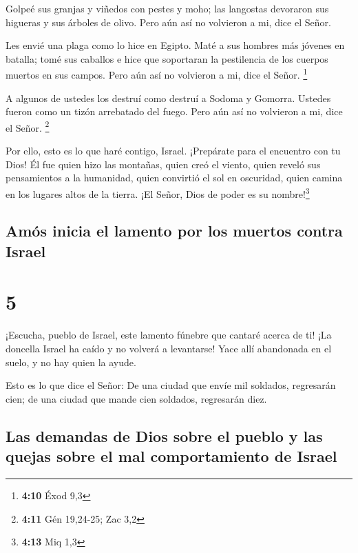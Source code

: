  Golpeé sus granjas y viñedos con pestes y moho; las
langostas devoraron sus higueras y sus árboles de olivo. Pero aún así no
volvieron a mi, dice el Señor.

 Les envié una plaga como lo hice en Egipto. Maté a sus
hombres más jóvenes en batalla; tomé sus caballos e hice que soportaran
la pestilencia de los cuerpos muertos en sus campos. Pero aún así no
volvieron a mi, dice el Señor. \footnote{\textbf{4:10} Éxod 9,3}

 A algunos de ustedes los destruí como destruí a Sodoma y
Gomorra. Ustedes fueron como un tizón arrebatado del fuego. Pero aún así
no volvieron a mi, dice el Señor. \footnote{\textbf{4:11} Gén 19,24-25;
  Zac 3,2}

 Por ello, esto es lo que haré contigo, Israel.
¡Prepárate para el encuentro con tu Dios!  Él fue quien
hizo las montañas, quien creó el viento, quien reveló sus pensamientos a
la humanidad, quien convirtió el sol en oscuridad, quien camina en los
lugares altos de la tierra. ¡El Señor, Dios de poder es su
nombre!\footnote{\textbf{4:13} Miq 1,3}

\hypertarget{amuxf3s-inicia-el-lamento-por-los-muertos-contra-israel}{%
\subsection{Amós inicia el lamento por los muertos contra
Israel}\label{amuxf3s-inicia-el-lamento-por-los-muertos-contra-israel}}

\hypertarget{section-4}{%
\section{5}\label{section-4}}

 ¡Escucha, pueblo de Israel, este lamento fúnebre que
cantaré acerca de ti!  ¡La doncella Israel ha caído y no
volverá a levantarse! Yace allí abandonada en el suelo, y no hay quien
la ayude.

 Esto es lo que dice el Señor: De una ciudad que envíe mil
soldados, regresarán cien; de una ciudad que mande cien soldados,
regresarán diez.

\hypertarget{las-demandas-de-dios-sobre-el-pueblo-y-las-quejas-sobre-el-mal-comportamiento-de-israel}{%
\subsection{Las demandas de Dios sobre el pueblo y las quejas sobre el
mal comportamiento de
Israel}\label{las-demandas-de-dios-sobre-el-pueblo-y-las-quejas-sobre-el-mal-comportamiento-de-israel}}


